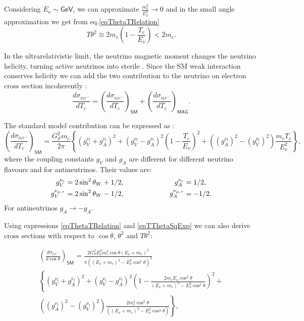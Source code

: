 Considering $E_{\nu}\sim\textsf{GeV}$, we can approximate $\frac{m_e^2}{E_{\nu}^2}\rightarrow 0$ and in the small angle approximation we get from eq.\ref{eqThetaTRelation} 
\begin{equation}\label{eqTThetaSqExp}
T\theta^2\cong 2m_e\left(1-\frac{T_e}{E_{\nu}}\right)<2m_e.
\end{equation}

In the ultrarelativistic limit, the neutrino magnetic moment changes the neutrino helicity, turning active neutrinos into sterile . Since the SM weak interaction conserves helicity we can add the two contribution to the neutrino on electron cross section incoherently \cite{nuElmagInt2015.pdf}:
\begin{equation}
\frac{d\sigma_{\nu_le^-}}{dT_e}=\left(\frac{d\sigma_{\nu_le^-}}{dT_e}\right)_{\textsf{SM}}+\left(\frac{d\sigma_{\nu_le^-}}{dT_e}\right)_{\textsf{MAG}}.
\end{equation}

The standard model contribution can be expressed as \cite{nuElmagInt2015.pdf}:
\begin{equation}
\left(\frac{d\sigma_{\nu_le^-}}{dT_e}\right)_{\textsf{SM}}=\frac{G_F^2m_e}{2\pi}\left\lbrace\left(g_V^{\nu_l}+g_A^{\nu_l}\right)^2+\left(g_V^{\nu_l}-g_A^{\nu_l}\right)^2\left(1-\frac{T_e}{E_{\nu}}\right)^2+\left(\left(g_A^{\nu_l}\right)^2-\left(g_V^{\nu_l}\right)^2\right)\frac{m_eT_e}{E_{\nu}^2}\right\rbrace,
\end{equation}
where the coupling constants $g_V$ and $g_A$ are different for different neutrino flavours and for antineutrinos. Their values are:
\begin{align}
g_V^{\nu_e}&=2\sin^2\theta_W+1/2,\hspace{2.5cm} g_A^{\nu_e}=1/2,\\
g_V^{\nu_{\mu,\tau}}&=2\sin^2\theta_W-1/2,\hspace{2.25cm} g_A^{\nu_{\mu,\tau}}=-1/2.
\end{align}
For antineutrinos $g_A\rightarrow -g_A$.

Using expressions \ref{eqThetaTRelation} and \ref{eqTThetaSqExp} we can also derive \cite{NuOnECrossSections1989.pdf} cross sections with respect to $\cos\theta$, $\theta^2$ and $T\theta^2$:

\begin{multline}
\left(\frac{d\sigma_{\nu_le^-}}{d\cos\theta}\right)_{\textsf{SM}}=
\frac{2G_F^2E_{\nu}^2m_e^2\cos\theta\left(E_{\nu}+m_e\right)^2}{\pi\left(\left(E_{\nu}+m_e\right)^2-E_{\nu}^2\cos^2\theta\right)^2}\\
\left\lbrace\left(g_V^{\nu_l}+g_A^{\nu_l}\right)^2 +
\left(g_V^{\nu_l}-g_A^{\nu_l}\right)^2\left(1-\frac{2m_eE_{\nu}\cos^2\theta}{\left(E_{\nu}+m_e\right)^2-E_{\nu}^2\cos^2\theta}\right)^2\right. +\\
\left.\left(\left(g_A^{\nu_l}\right)^2-\left(g_V^{\nu_l}\right)^2\right)
\frac{2m_e^2\cos^2\theta}{\left(\left(E_{\nu}+m_e\right)^2-E_{\nu}^2\cos^2\theta\right)}\right\rbrace,
\end{multline}
 
